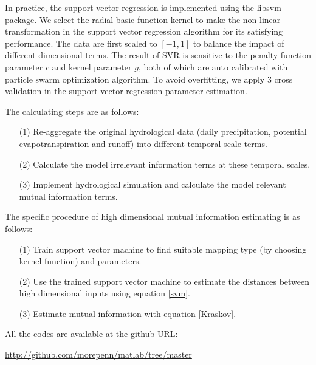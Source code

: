 \documentclass[review]{elsarticle}
\begin{document}
In practice, the support vector regression is implemented using the libsvm package\citep{chang2011libsvm}.  We select the radial basic function kernel to make the non-linear transformation in the support vector regression algorithm for its satisfying performance. The data are first scaled to $[-1,1]$ to balance the impact of different dimensional terms. The result of SVR is sensitive to the penalty function parameter $c$ and kernel parameter $g$, both of which are auto calibrated with particle swarm optimization algorithm\citep{shi1998modified}. To avoid overfitting, we apply  3 cross validation in the support vector regression parameter estimation. 

The calculating steps are as follows:
 \begin{enumerate}
 \item [(1)]Re-aggregate the original hydrological data (daily precipitation, potential evapotranspiration and runoff) into different temporal scale terms. 
 \item [(2)]Calculate the  model irrelevant information terms  at these temporal scales.
 \item [(3)]Implement hydrological simulation and calculate the model relevant mutual information terms.
 \end{enumerate}

The specific procedure of high dimensional mutual information estimating is as follows:
\begin{enumerate}
\item [(1)]Train support vector machine to find suitable mapping type (by choosing kernel function) and parameters.
\item [(2)]Use the trained support vector machine to estimate the distances between high dimensional inputs using equation \ref{svm}.
\item [(3)]Estimate mutual information with equation \ref{Kraskov}.
\end{enumerate}

 
All the codes are available at the github URL: 

\underline{http://github.com/morepenn/matlab/tree/master}
 
\end{document}

